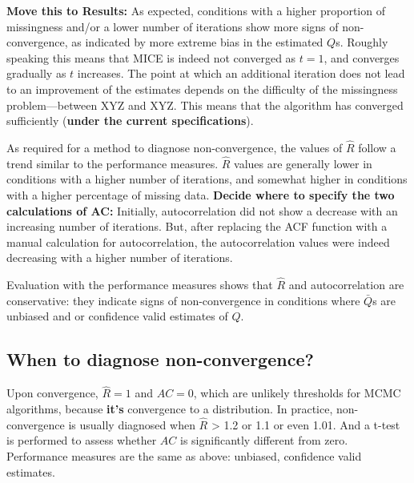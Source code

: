 \documentclass[Royal,times,sageh]{sagej}
\begin{document}
\textbf{Move this to Results:} As expected, conditions with a higher
proportion of missingness and/or a lower number of iterations show more
signs of non-convergence, as indicated by more extreme bias in the
estimated \(Q\)s. Roughly speaking this means that MICE is indeed not
converged as \(t=1\), and converges gradually as \(t\) increases. The
point at which an additional iteration does not lead to an improvement
of the estimates depends on the difficulty of the missingness
problem---between XYZ and XYZ. This means that the algorithm has
converged sufficiently (\textbf{under the current specifications}).

As required for a method to diagnose non-convergence, the values of
\(\widehat{R}\) follow a trend similar to the performance measures.
\(\widehat{R}\) values are generally lower in conditions with a higher
number of iterations, and somewhat higher in conditions with a higher
percentage of missing data. \textbf{Decide where to specify the two
calculations of AC:} Initially, autocorrelation did not show a decrease
with an increasing number of iterations. But, after replacing the ACF
function with a manual calculation for autocorrelation, the
autocorrelation values were indeed decreasing with a higher number of
iterations.

Evaluation with the performance measures shows that \(\widehat{R}\) and
autocorrelation are conservative: they indicate signs of non-convergence
in conditions where \(\bar{Q}\)s are unbiased and or confidence valid
estimates of \(Q\).

\hypertarget{when-to-diagnose-non-convergence}{%
\subsection{When to diagnose
non-convergence?}\label{when-to-diagnose-non-convergence}}

Upon convergence, \(\widehat{R}=1\) and \(AC=0\), which are unlikely
thresholds for MCMC algorithms, because \textbf{it's} convergence to a
distribution. In practice, non-convergence is usually diagnosed when
\(\widehat{R}\) \textgreater{} 1.2 or 1.1 or even 1.01. And a t-test is
performed to assess whether \(AC\) is significantly different from zero.
Performance measures are the same as above: unbiased, confidence valid
estimates.
\end{document}
